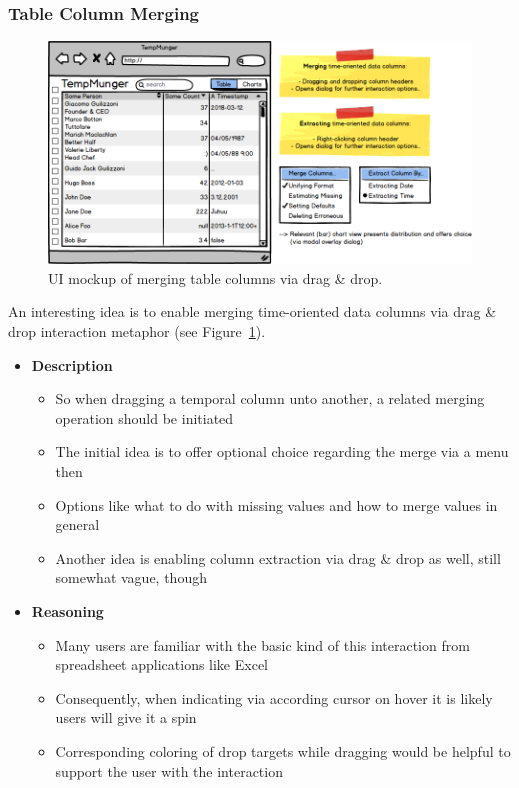 \subsubsection{Table Column Merging}

\begin{figure}[h]
  \centering
  \includegraphics[width=1.175\textwidth]{figures/design/mockup-5}
  \caption{UI mockup of merging table columns via drag \& drop.}
  \label{fig:mockup-5}
\end{figure}

An interesting idea is to enable merging time-oriented data columns via drag \& drop interaction metaphor (see Figure~\ref{fig:mockup-5}).

\begin{itemize}
  \item \textbf{Description}
  \begin{itemize}
    \item So when dragging a temporal column unto another, a related merging operation should be initiated
    \item The initial idea is to offer optional choice regarding the merge via a menu then
    \item Options like what to do with missing values and how to merge values in general
    \item Another idea is enabling column extraction via drag \& drop as well, still somewhat vague, though
  \end{itemize}
  \item \textbf{Reasoning}
  \begin{itemize}
    \item Many users are familiar with the basic kind of this interaction from spreadsheet applications like Excel
    \item Consequently, when indicating via according cursor on hover it is likely users will give it a spin
    \item Corresponding coloring of drop targets while dragging would be helpful to support the user with the interaction
  \end{itemize}
\end{itemize}


